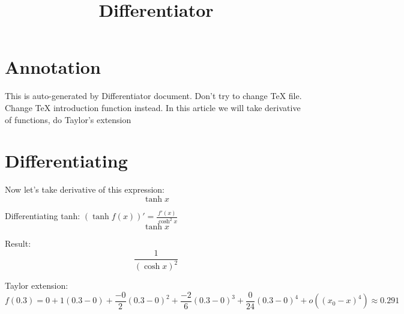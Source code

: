 \documentclass{article}
\title{\textbf{Differentiator}}
\date{}
\author{\text{Котляров Михаил, Б01-402}}
\begin{document}
\maketitle
\section*{Annotation}
This is auto-generated by Differentiator document. Don't try to change TeX file. Change TeX introduction function instead.
In this article we will take derivative of functions, do Taylor's extension
\section*{Differentiating}
Now let's take derivative of this expression: 
\[\tanh{x}\]


Differentiating tanh: $(\tanh{f(x)})' = \frac{f'(x)} {{\cosh^{2}x}}$
\[\tanh{x}\]

 Result: 
\[\frac{1} {{(\cosh{x})}^{2}}\]


Taylor extension: 
\[ f(0.3) = 0 + {1} {({0.3} - {0})} + \frac{-0} {2}({0.3} - {0})^2 + \frac{-2} {6}({0.3} - {0})^3 + \frac{0} {24}({0.3} - {0})^4 + o((x_0-x)^4) \stackrel{}{\approx} 0.291\]
\end{document}
